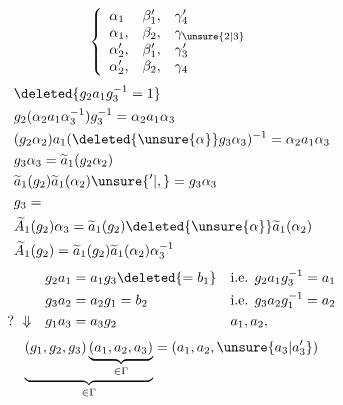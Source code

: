 \[
 \left\{\begin{array}{lll}
 \alpha_1&\beta'_1,&\gamma'_4\\\alpha_1,&\beta_2,&\gamma_{\unsure{2|3}}\\
 \alpha'_2,&\beta'_1,&\gamma'_3\\\alpha'_2,&\beta_2,&\gamma_4
 \end{array}\right.
\]
\[
\begin{aligned}
 &\deleted{g_2a_1g_3^{-1}=1}\\
 &g_2(\alpha_2a_1\alpha_3^{-1})g_3^{-1}=\alpha_2a_1\alpha_3\\
 &(g_2\alpha_2)a_1(\deleted{\unsure{\alpha}}g_3\alpha_3)^{-1}=\alpha_2a_1\alpha_3\\
 &g_3\alpha_3=\widetilde a_1(g_2\alpha_2)\\
 &\widetilde a_1(g_2)\widetilde a_1(\alpha_2)\unsure{'|,}=g_3\alpha_3\\
 &g_3=\\
 &\widetilde A_1(g_2)\alpha_3=\widetilde a_1(g_2)\deleted{\unsure{\alpha}}\widetilde a_1(\alpha_2)\\
 &\widetilde A_1(g_2)=\widetilde a_1(g_2)\widetilde a_1(\alpha_2)\alpha_3^{-1}
\end{aligned}
\]
\[
\begin{aligned}
 &g_2a_1=a_1g_3\deleted{=b_1}&&\text{i.e. }g_2a_1g_3^{-1}=a_1\\
 &g_3a_2=a_2g_1=b_2&&\text{i.e. }g_3a_2g_1^{-1}=a_2\\
 ?\ \Downarrow\quad&g_1a_3=a_3g_2&&a_1,a_2,
\end{aligned}
\]
\[
 \underbrace{(g_1,g_2,g_3)\underbrace{(a_1,a_2,a_3)}_{\in \Gamma}}_{\in \Gamma}
       =(a_1,a_2,\unsure{a_3|a'_3})
\]
